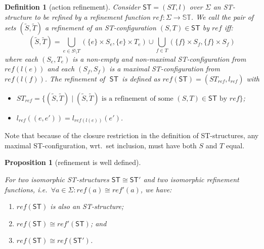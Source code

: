 \documentclass[submission,copyright,creativecommons]{eptcs}
\newtheorem{proposition}[theorem]{Proposition}
\newtheorem{definition}[theorem]{Definition}
\newcommand\ST{\ensuremath{\mathsf{ST}}}
\newcommand\allST{\ensuremath{\mathbb{ST}}}
\newcommand\reffun{\ensuremath{\mathit{ref}}}
\newcommand\refinement[1]{\ensuremath{\widetilde{#1}}}
\newcommand\isomorphic{\ensuremath{\cong}}
\begin{document}
\begin{definition}[action refinement]\label{def_actref}
Consider $\ST=(ST,l)$ over $\Sigma$ an \emph{ST-structure to be refined} by a \emph{refinement function} $\reffun:\Sigma\rightarrow \allST$. We call the pair of sets $(\refinement{S},\refinement{T})$ \emph{a refinement of an ST-config\-uration $(S,T)\in\ST$ by \reffun} iff:
\[
(\refinement{S},\refinement{T})=\bigcup_{e\in S\setminus T}(\{e\}\times S_{e},\{e\}\times T_{e})\cup\bigcup_{f\in T}(\{f\}\times S_{f},\{f\}\times S_{f})
\]
where each $(S_{e},T_{e})$ is a non-empty and non-maximal ST-configuration from $\reffun(l(e))$ and each $(S_{f},S_{f})$ is a maximal ST-configuration from $\reffun(l(f))$.
The refinement of\,\ \ST\ is defined as $\reffun(\ST)=(ST_{\reffun},l_{\reffun})$ with
\begin{itemize}
\item $ST_{\reffun}=\{(\refinement{S},\refinement{T})\mid (\refinement{S},\refinement{T})\mbox{ is a refinement of some }(S,T)\in\ST\mbox{ by }\reffun\}$;
\item $l_{\reffun}((e,e'))=l_{\reffun(l(e))}(e')$.
\end{itemize}
\end{definition}

Note that because of the closure restriction in the definition of ST-structures, any maximal ST-configuration, wrt.\ set inclusion, must have both $S$ and $T$ equal.

\begin{proposition}[refinement is well defined]\label{prop_ref1}\ 

For two isomorphic ST-structures $\ST\isomorphic\ST'$ and two isomorphic refinement functions, i.e.\ $\forall a\in\Sigma:\reffun(a)\isomorphic\reffun'(a)$, we have: 

\begin{enumerate}
\item $\reffun(\ST)$ is also an ST-structure;
\item $\reffun(\ST)\isomorphic\reffun'(\ST)$; and
\item $\reffun(\ST)\isomorphic\reffun(\ST')$.
\end{enumerate}
\end{proposition}
\end{document}
